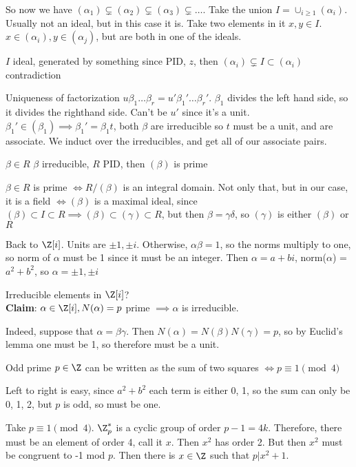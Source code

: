 \documentclass[10pt]{article}
\begin{document}
So now we have $(\alpha_1) \subsetneq (\alpha_2) \subsetneq (\alpha_3) \subsetneq \ldots$. Take the union $I = \cup_{i \geq 1} (\alpha_i)$. Usually not an ideal, but in this case it is. Take two elements in it $x, y \in I$. $x \in (\alpha_i), y \in (\alpha_j)$, but are both in one of the ideals. 

$I$ ideal, generated by something since PID, $z$, then $(\alpha_i) \subsetneq I \subset(\alpha_i)$ contradiction

Uniqueness of factorization $u\beta_1 \ldots \beta_r = u' \beta_1'\ldots\beta_r'$. $\beta_1$ divides the left hand side, so it divides the righthand side. Can't be $u'$ since it's a unit. $\beta_1' \in (\beta_1) \implies \beta_1' = \beta_1 t$, both $\beta$ are irreducible so $t$ must be a unit, and are associate. We induct over the irreducibles, and get all of our associate pairs.

\begin{lem}
    $\beta \in R$ $\beta$ irreducible, $R$ PID, then $(\beta)$ is prime
\end{lem}
$\beta \in R$ is prime $\iff R/(\beta)$ is an integral domain. Not only that, but in our case, it is a field $\iff (\beta)$ is a maximal ideal, since $(\beta) \subset I \subset R \implies (\beta) \subset (\gamma) \subset R$, but then $\beta = \gamma\delta$, so $(\gamma)$ is either $(\beta)$ or $R$

Back to $\Z[i]$. Units are $\pm 1, \pm i$. Otherwise, $\alpha\beta = 1$, so the norms multiply to one, so norm of $\alpha$ must be 1 since it must be an integer. Then $\alpha = a + bi$, norm($\alpha$) = $a^2 + b^2$, so $\alpha = \pm 1, \pm i$

Irreducible elements in $\Z[i]$? \\
\textbf{Claim}: $\alpha \in \Z[i], N(\alpha) = p$ prime $\implies \alpha$ is irreducible.

Indeed, suppose that $\alpha = \beta\gamma$. Then $N(\alpha) = N(\beta)N(\gamma) = p$, so by Euclid's lemma one must be 1, so therefore must be a unit.

\begin{thm}[Fermat]
    Odd prime $p \in \Z$ can be written as the sum of two squares $\iff p \equiv 1 \pmod{4}$
\end{thm}
Left to right is easy, since $a^2 + b^2$ each term is either 0, 1, so the sum can only be 0, 1, 2, but $p$ is odd, so must be one.

Take $p \equiv 1\pmod{4}$. $\Z_p^*$ is a cyclic group of order $p - 1 = 4k$. Therefore, there must be an element of order 4, call it $x$. Then $x^2$ has order 2. But then $x^2$ must be congruent to -1 mod $p$. Then there is $x \in \Z$ such that $p | x^2 + 1$. 
\end{document}
